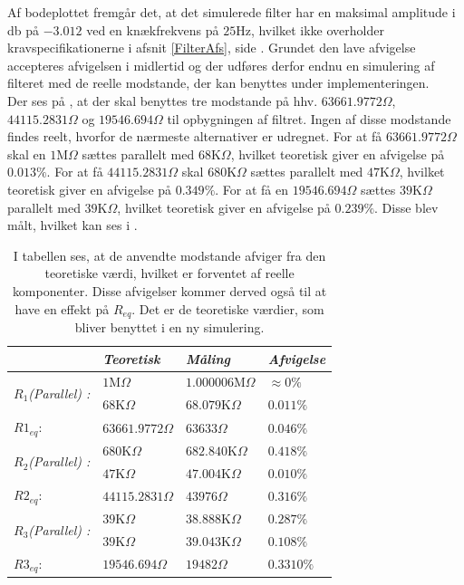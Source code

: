 \noindent Af bodeplottet fremgår det, at det simulerede filter har en maksimal amplitude i db på $-3.012$ ved en knækfrekvens på $25$Hz, hvilket ikke overholder kravspecifikationerne i afsnit \ref{FilterAfs}, side \pageref{FilterAfs}. Grundet den lave afvigelse accepteres afvigelsen i midlertid og der udføres derfor endnu en simulering af filteret med de reelle modstande, der kan benyttes under implementeringen. \\
Der ses på , at der skal benyttes tre modstande på hhv. $63661.9772\Omega$, $44115.2831\Omega$ og $19546.694\Omega$ til opbygningen af filtret. Ingen af disse modstande findes reelt, hvorfor de nærmeste alternativer er udregnet. For at få $63661.9772\Omega$ skal en $1$M$\Omega$  sættes parallelt med $68$K$\Omega$, hvilket teoretisk giver en afvigelse på $0.013\%$. For at få $44115.2831\Omega$ skal $680$K$\Omega$ sættes parallelt med $47$K$\Omega$, hvilket teoretisk giver en afvigelse på $0.349\%$. For at få en $19546.694\Omega$ sættes $39$K$\Omega$ parallelt med $39$K$\Omega$, hvilket teoretisk giver en afvigelse på $0.239\%$. Disse blev målt, hvilket kan ses i .
\begin{table}[H]
	\centering
	\begin{tabular}{|l|l|l|l|}
		\hline
		\textit{}                                     & \textit{Teoretisk} & \textit{Måling}    & \textit{Afvigelse} \\ \hline
		\multirow{2}{*}{\textit{$R_{1}$(Parallel) :}} & $1$M$\Omega$       & $1.000006$M$\Omega$  & $\approx 0\%$           \\ \cline{2-4} 
		& $68$K$\Omega$      & $68.079$K$\Omega$ & $0.011\%$           \\ \cline{2-4}
		$R1_{eq}$: & $63661.9772\Omega$ & $63633\Omega$ &  $0.046\%$ \\ \hline
		\multirow{2}{*}{\textit{$R_{2}$(Parallel) :}} & $680$K$\Omega$     & $682.840$K$\Omega$  & $0.418\%$        \\ \cline{2-4} 
		& $47$K$\Omega$      & $47.004$K$\Omega$ & $0.010\%$           \\ \cline{2-4}
		$R2_{eq}$: & $44115.2831\Omega$ & $43976\Omega$ & $0.316\%$ \\ \hline
		\multirow{2}{*}{\textit{$R_{3}$(Parallel) :}} & $39$K$\Omega$      & $38.888$K$\Omega$    & $0.287\%$           \\ \cline{2-4} 
		& $39$K$\Omega$     & $39.043$K$\Omega$        & $0.108\%$           \\ \cline{2-4}
		$R3_{eq}$: & $19546.694\Omega$ & $19482\Omega$  & $0.3310\%$ \\ \hline
	\end{tabular}
	\caption{I tabellen ses, at de anvendte modstande afviger fra den teoretiske værdi, hvilket er forventet af reelle komponenter. Disse afvigelser kommer derved også til at have en effekt på $R_{eq}$. Det er de teoretiske værdier, som bliver benyttet i en ny simulering.}
	\label{Tab:Maalingafmodstande_filter}
\end{table}
